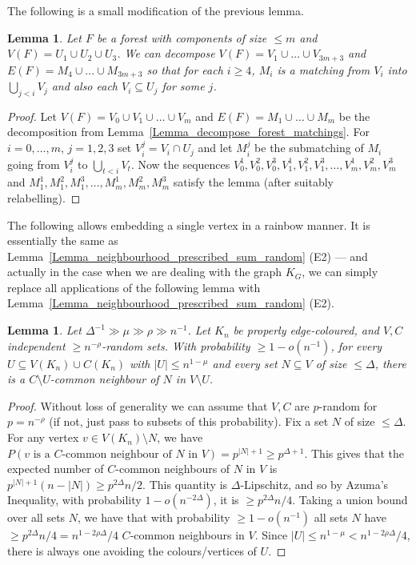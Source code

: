 \documentclass[a4paper,11pt,hidelinks]{amsart}
\newtheorem{lemma}[theorem]{Lemma}
\theoremstyle{definition}
\begin{document}
The following is a small modification of the previous lemma.
\begin{lemma}\label{Lemma_decompose_forest_matchings_U1U2U3}
Let $F$ be a forest with components of size $\leq m$ and $V(F)=U_1\cup U_2\cup U_3$. We can decompose $V(F)=V_1\cup \dots \cup V_{3m+3}$ and $E(F)=M_{4}\cup \dots \cup M_{3m+3}$ so that for each $i\geq 4$, $M_i$ is  a matching from $V_i$ into $\bigcup_{j<i}V_j$ and also each $V_i\subseteq U_j$ for some $j$.
\end{lemma}
\begin{proof}
Let $V(F)=V_0\cup V_1\cup \dots \cup V_m$ and $E(F)=M_1\cup \dots \cup M_m$ be the decomposition from Lemma~\ref{Lemma_decompose_forest_matchings}. For $i=0, \dots, m$, $j=1,2,3$ set $V_i^j=V_i\cap U_j$ and let $M_i^j$ be the submatching of $M_i$ going from $V_i^j$ to $\bigcup_{t<i}V_t$. Now the sequences $V_0^1, V_0^2, V_0^3, V_1^1, V_1^2, V_1^3, \dots, V_m^1, V_m^2, V_m^3$ and $M_1^1, M_1^2, M_1^3, \dots, M_m^1, M_m^2, M_m^3$ satisfy the lemma (after suitably relabelling).
\end{proof} 
 


The following allows embedding a single vertex in a rainbow manner. It is essentially the same as Lemma~\ref{Lemma_neighbourhood_prescribed_sum_random} (E2) --- and actually in the case when we are dealing with the graph $K_G$, we can simply replace all applications of the following lemma with Lemma~\ref{Lemma_neighbourhood_prescribed_sum_random} (E2).
\begin{lemma}\label{Lemma_embed_neighbourhood_random}
Let $\Delta^{-1}\gg \mu\gg \rho\gg n^{-1}$.
Let $K_n$ be properly edge-coloured, and $V,C$ independent $\geq n^{-\rho}$-random sets. With probability $\geq 1-o(n^{-1})$, for every $U\subseteq V(K_n)\cup C(K_n)$ with $|U|\leq n^{1-\mu}$ and every set $N\subseteq V$ of size $\leq \Delta$, there is a $C\setminus U$-common neighbour of $N$ in $V\setminus U$.
\end{lemma}
\begin{proof}
Without loss of generality we can assume that $V,C$ are $p$-random for $p=n^{-\rho}$ (if not, just pass to subsets of this probability). 
Fix a set $N$ of size $\leq \Delta$. For any vertex $v\in V(K_n)\setminus N$, we have $P(v \text{ is a $C$-common neighbour of $N$ in $V$})=p^{|N|+1}\geq p^{\Delta+1}$. This gives  that the expected number of $C$-common neighbours of $N$ in $V$ is $p^{|N|+1}(n-|N|)\geq p^{2\Delta}n/2$. This quantity is $\Delta$-Lipschitz, and so by Azuma's Inequality, with probability $1-o(n^{-2\Delta})$, it is $\geq p^{2\Delta}n/4$. Taking a union bound over all sets $N$, we have that with probability $\geq 1-o(n^{-1})$ all sets $N$ have $\geq  p^{2\Delta}n/4=n^{1-2\rho\Delta}/4$ $C$-common neighbours in $V$. Since $|U|\leq n^{1-\mu}<n^{1-2\rho\Delta}/4$, there is always one avoiding the colours/vertices of $U$.
\end{proof}
\end{document}
